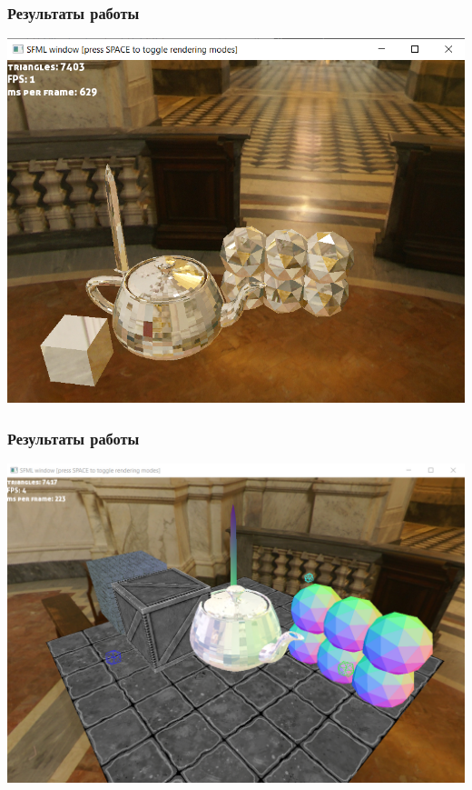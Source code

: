 \documentclass{beamer}
\begin{document}
\begin{frame}
	\frametitle{Результаты работы}
	\includegraphics[scale=0.45]{img2.png} 
	
\end{frame}
\begin{frame}
	\frametitle{Результаты работы}
	\includegraphics[scale=0.4]{img3.png} 
	
\end{frame}
\end{document}
